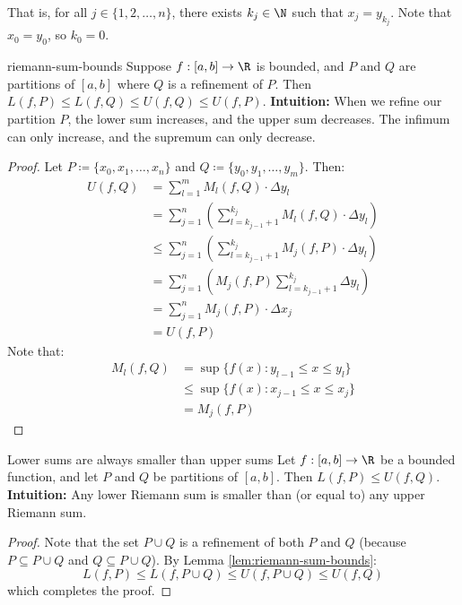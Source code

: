 That is, for all $j \in \{1,2, \ldots, n\}$, there exists $k_j \in \N$ such that $x_j = y_{k_j}$. Note that $x_0 = y_0$, so $k_0 = 0$.

\begin{lembox}{}{riemann-sum-bounds}
    Suppose $f : [a,b] \to \R$ is bounded, and $P$ and $Q$ are partitions of $[a,b]$ where $Q$ is a refinement of $P$. Then $L(f,P) \leq L(f, Q) \leq U(f, Q) \leq U(f,P)$.
    \tcblower
    \textbf{Intuition:} When we refine our partition $P$, the lower sum increases, and the upper sum decreases. The infimum can only increase, and the supremum can only decrease.
    \begin{proof}
        Let $P \coloneq \{x_0, x_1, \ldots, x_n\}$ and $Q \coloneq \{y_0, y_1, \ldots, y_m\}$. Then:
        \begin{align*}
            U(f,Q)
            &= \sum_{l=1}^{m} M_l(f,Q) \cdot \Delta y_l \\
            &= \sum_{j=1}^{n} \left( \sum_{l=k_{j-1}+1}^{k_j} M_l(f, Q) \cdot \Delta y_l \right) \\
            &\leq \sum_{j=1}^{n} \left( \sum_{l=k_{j-1}+1}^{k_j} M_j(f, P) \cdot \Delta y_l \right) \\
            &= \sum_{j=1}^{n} \left( M_j(f,P) \sum_{l=k_{j-1}+1}^{k_j} \Delta y_l \right) \\
            &= \sum_{j=1}^{n} M_j(f, P) \cdot \Delta x_j \\
            &= U(f,P)
        \end{align*}
        Note that:
        \begin{align*}
            M_l(f,Q)
            &= \sup \{ f(x) : y_{l-1} \leq x \leq y_l \} \\
            &\leq \sup\{ f(x) : x_{j-1} \leq x \leq x_j \} \\
            &= M_j(f,P)
        \end{align*}
    \end{proof}
\end{lembox}

\begin{lembox}{Lower sums are always smaller than upper sums}{}
    Let $f : [a,b] \to \R$ be a bounded function, and let $P$ and $Q$ be partitions of $[a,b]$. Then $L(f, P) \leq U(f, Q)$.
    \tcblower
    \textbf{Intuition:} Any lower Riemann sum is smaller than (or equal to) any upper Riemann sum.
    \begin{proof}
        Note that the set $P \cup Q$ is a refinement of both $P$ and $Q$ (because $P \subseteq P \cup Q$ and $Q \subseteq P \cup Q$). By Lemma \ref{lem:riemann-sum-bounds}:
        \[ L(f, P) \leq L(f, P \cup Q) \leq U(f, P \cup Q) \leq U(f, Q) \]
        which completes the proof.
    \end{proof}
\end{lembox}


